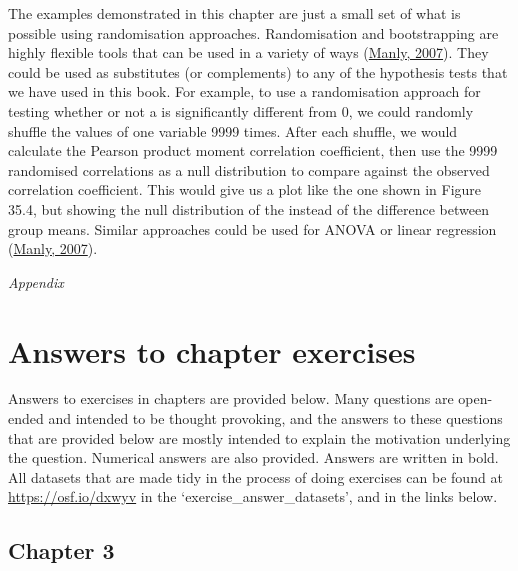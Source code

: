 \documentclass[
  openany]{krantz}
\begin{document}
The examples demonstrated in this chapter are just a small set of what is possible using randomisation approaches.
Randomisation and bootstrapping are highly flexible tools that can be used in a variety of ways (\protect\hyperlink{ref-Manly2007}{Manly, 2007}).
They could be used as substitutes (or complements) to any of the hypothesis tests that we have used in this book.
For example, to use a randomisation approach for testing whether or not a  is significantly different from 0, we could randomly shuffle the values of one variable 9999 times.
After each shuffle, we would calculate the Pearson product moment correlation coefficient, then use the 9999 randomised correlations as a null distribution to compare against the observed correlation coefficient.
This would give us a plot like the one shown in Figure 35.4, but showing the null distribution of the  instead of the difference between group means.
Similar approaches could be used for ANOVA or linear regression (\protect\hyperlink{ref-Manly2007}{Manly, 2007}).

\clearpage
\thispagestyle{empty}
\begin{Huge}
\textit{Appendix}
\end{Huge}

\hypertarget{appendix-appendix}{%
\appendix {}}


\hypertarget{appendexA}{%
\chapter{Answers to chapter exercises}\label{appendexA}}

Answers to exercises in chapters are provided below.
Many questions are open-ended and intended to be thought provoking, and the answers to these questions that are provided below are mostly intended to explain the motivation underlying the question.
Numerical answers are also provided.
Answers are written in bold.
All datasets that are made tidy in the process of doing exercises can be found at \url{https://osf.io/dxwyv} in the `exercise\_answer\_datasets', and in the links below.

\hypertarget{chapter-3}{%
\section{Chapter 3}\label{chapter-3}}
\end{document}
